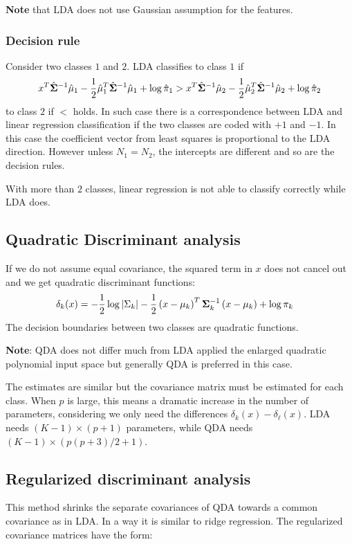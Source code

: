 \textbf{Note} that LDA does not use Gaussian assumption for the features.

\subsubsection{Decision rule}
Consider two classes $1$ and $2$. LDA classifies to class $1$ if
\begin{equation}
x^T\mathrm{\hat{\mathbf{\Sigma}}}^{-1} \hat{\mu}_1 - \frac{1}{2}\hat{\mu}_1^T\mathrm{\hat{\mathbf{\Sigma}}}^{-1}\hat{\mu}_1 + \log \hat{\pi}_1 >x^T\mathrm{\hat{\mathbf{\Sigma}}}^{-1} \hat{\mu}_2 - \frac{1}{2}\hat{\mu}_2^T\mathrm{\hat{\mathbf{\Sigma}}}^{-1}\hat{\mu}_2 + \log \hat{\pi}_2
\end{equation}
to class $2$ if $<$ holds. In such case there is a correspondence between LDA and linear regression classification if the two classes are coded with $+1$ and $-1$. In this case the coefficient vector from least squares is proportional to the LDA direction. However unless $N_1=N_2$, the intercepts are different and so are the decision rules.

With more than $2$ classes, linear regression is not able to classify correctly while LDA does.

\subsection{Quadratic Discriminant analysis}
If we do not assume equal covariance, the squared term in $x$ does not cancel out and we get quadratic discriminant functions:
\begin{equation}
\label{QDA}
\begin{aligned}
\delta_k  (x) &= -\frac{1}{2} \log |\Sigma_k| -\frac{1}{2} \left( x - \mu_k \right)^T \mathbf{\Sigma}^{-1}_k\left( x - \mu_k \right) + \log \pi_k
\end{aligned}
\end{equation}
The decision boundaries between two classes are quadratic functions.

\textbf{Note}: QDA does not differ much from LDA applied the enlarged quadratic polynomial input space but generally QDA is preferred in this case.

The estimates are similar but the covariance matrix must be estimated for each class. When $p$ is large, this means a dramatic increase in the number of parameters, considering we only need the differences $\delta_k (x) - \delta_\ell(x)$. LDA needs $(K-1)\times (p+1)$ parameters, while QDA needs $(K-1) \times \left(p\left(p+3\right)/2 +1\right)$.

\subsection{Regularized discriminant analysis}
This method shrinks the separate covariances of QDA towards a common covariance as in LDA. In a way it is similar to ridge regression. The regularized covariance matrices have the form:

